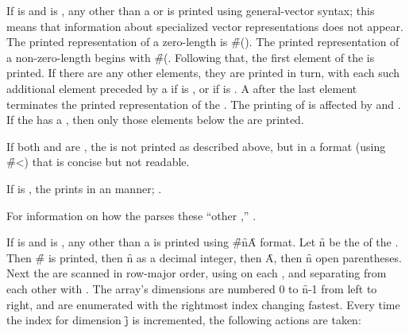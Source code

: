 If  is  
and  is ,
any
other than a  or  is printed using
general-vector syntax; this means that information
about specialized vector representations does not appear.
The printed representation of a zero-length  is \f{\#()}.
The printed representation of a non-zero-length  begins with \f{\#(}.
Following that, the first element of the  is printed.  
If there are any other elements, they are printed in turn, with 
each such additional element preceded by
a  if  is ,
or  if  is .
A  after the last element
terminates the printed representation of the . 
The printing of  
is affected by  and .
If the  has a , 
then only those elements below
the  are printed.

If both  and  are ,
the  is not printed as described above,
but in a format (using \f{\#<}) that is concise but not readable.

If  is ,
the  prints in an  manner;
.

For information on how the  parses these ``other ,''
\seesection\SharpsignLeftParen.

\endsubsubsection%

If   is  
and  is ,
any
 other than a  is printed
using \f{\#}\f{n}\f{A} format.
Let \f{n} be the  of the .
Then \f{\#} is printed, then \f{n} as a decimal integer,
then \f{A}, then \f{n} open parentheses.  
Next the  are scanned in row-major order,
using  on each , 
and separating  from each other with .
The array's dimensions are numbered 0 to \f{n}-1 from left to right,
and are enumerated with the rightmost index changing fastest.
Every time the index for dimension \f{j} is incremented,
the following actions are taken:

